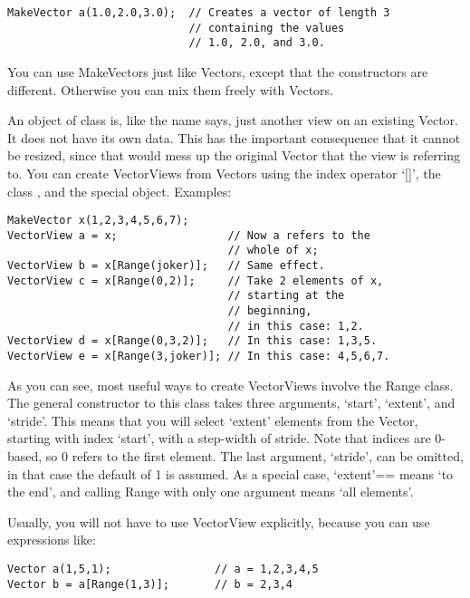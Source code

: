 \begin{verbatim}
MakeVector a(1.0,2.0,3.0);  // Creates a vector of length 3 
                            // containing the values 
                            // 1.0, 2.0, and 3.0.
\end{verbatim}

You can use MakeVectors just like Vectors, except that the
constructors are different. Otherwise you can mix them freely with
Vectors. 

\label{sec:vector_views}

An object of class  is, like the name says, just
another view on an existing Vector. It does not have its own
data. This has the important consequence that it cannot be resized,
since that would mess up the original Vector that the view is
referring to. You can create VectorViews from Vectors using the index
operator `[]', the class , and the special 
object. Examples:

\begin{verbatim}
MakeVector x(1,2,3,4,5,6,7); 
VectorView a = x;                 // Now a refers to the 
                                  // whole of x;
VectorView b = x[Range(joker)];   // Same effect.
VectorView c = x[Range(0,2)];     // Take 2 elements of x, 
                                  // starting at the 
                                  // beginning,
                                  // in this case: 1,2.
VectorView d = x[Range(0,3,2)];   // In this case: 1,3,5.
VectorView e = x[Range(3,joker)]; // In this case: 4,5,6,7.
\end{verbatim}

As you can see, most useful ways to create VectorViews involve the
Range class. The general constructor to this class takes three
arguments, `start', `extent', and `stride'. This means that you will
select `extent' elements from the Vector, starting with index `start',
with a step-width of stride. Note that indices are 0-based, so 0
refers to the first element. The last argument, `stride', can be
omitted, in that case the default of 1 is assumed. As a special case,
`extent'== means `to the end', and calling Range with only one
argument  means `all elements'.

Usually, you will not have to use VectorView explicitly, because you
can use expressions like:

\begin{verbatim}
Vector a(1,5,1);                // a = 1,2,3,4,5
Vector b = a[Range(1,3)];       // b = 2,3,4
\end{verbatim}

